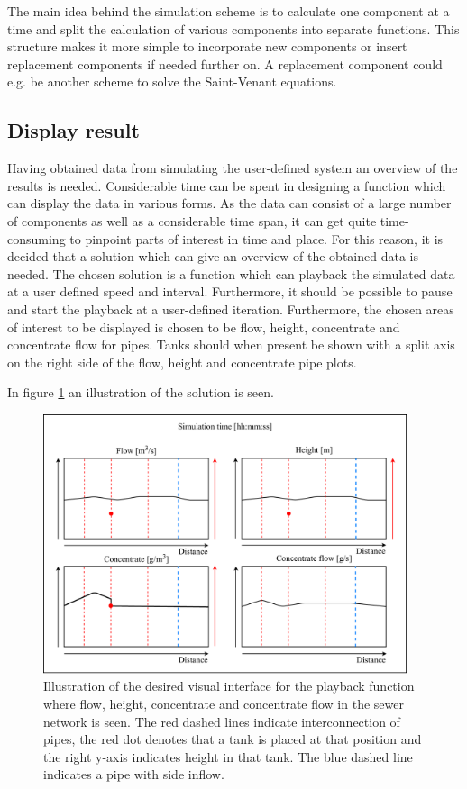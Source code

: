 The main idea behind the simulation scheme is to calculate one component at a time and split the calculation of various components into separate functions.
This structure makes it more simple to incorporate new components or insert replacement components if needed further on. A replacement component could e.g. be another scheme to solve the Saint-Venant equations.  

\subsection*{Display result}

Having obtained data from simulating the user-defined system an overview of the results is needed. Considerable time can be spent in designing a function which can display the data in various forms. As the data can consist of a large number of components as well as a considerable time span, it can get quite time-consuming to pinpoint parts of interest in time and place. For this reason, it is decided that a solution which can give an overview of the obtained data is needed. The chosen solution is a function which can playback the simulated data at a user defined speed and interval. Furthermore, it should be possible to pause and start the playback at a user-defined iteration. Furthermore, the chosen areas of interest to be displayed is chosen to be flow, height, concentrate and concentrate flow for pipes. Tanks should when present be shown with a split axis on the right side of the flow, height and concentrate pipe plots.

In figure \ref{fig:display_results} an illustration of the solution is seen.   

\begin{figure}[H]
	\centering
	\includegraphics[width=0.95\textwidth]{report/simulation/pictures/display_results}
	\caption{Illustration of the desired visual interface for the playback function where flow, height, concentrate and concentrate flow in the sewer network is seen. The red dashed lines indicate interconnection of pipes, the red dot denotes that a tank is placed at that position and the right y-axis indicates height in that tank. The blue dashed line indicates a pipe with side inflow.}
	\label{fig:display_results}
\end{figure}

